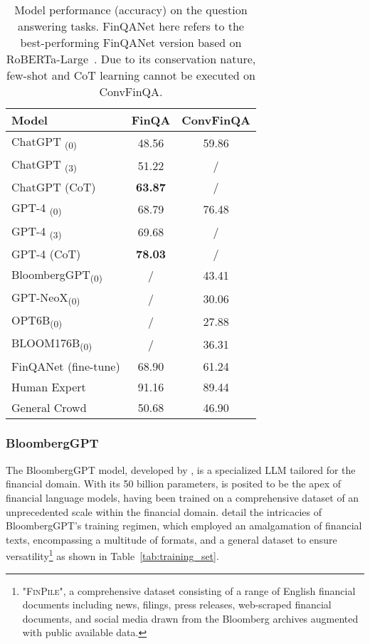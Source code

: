 \begin{table}[!h]
	\centering
	\begin{tabularx}{0.8\textwidth}{Xcc}
		\toprule
		\textbf{Model}                  & \textbf{FinQA} & \textbf{ConvFinQA} \\
		\midrule
		ChatGPT \textsubscript{(0)}     & 48.56          & 59.86              \\
		ChatGPT \textsubscript{(3)}     & 51.22          & /                  \\
		ChatGPT (CoT)                   & \textbf{63.87} & /                  \\
		GPT-4 \textsubscript{(0)}       & 68.79          & 76.48              \\
		GPT-4 \textsubscript{(3)}       & 69.68          & /                  \\
		GPT-4 (CoT)                     & \textbf{78.03} & /                  \\
		BloombergGPT\textsubscript{(0)} & /              & 43.41              \\
		GPT-NeoX\textsubscript{(0)}     & /              & 30.06              \\
		OPT6B\textsubscript{(0)}        & /              & 27.88              \\
		BLOOM176B\textsubscript{(0)}    & /              & 36.31              \\
		FinQANet (fine-tune)            & 68.90          & 61.24              \\
		Human Expert                    & 91.16          & 89.44              \\
		General Crowd                   & 50.68          & 46.90              \\
		\bottomrule
	\end{tabularx}
	\caption{Model performance (accuracy) on the question answering tasks. FinQANet here refers to the best-performing FinQANet version based on RoBERTa-Large~\cite{chen2022afinqa}. Due to its conservation nature, few-shot and CoT learning cannot be executed on ConvFinQA.}
	\label{tab:model_performance_qa}
\end{table}

\subsubsection{BloombergGPT}
\label{subsubsec:bloomberggpt}

The BloombergGPT model, developed by \textcite{wu2023bloomberggpt}, is a specialized LLM tailored for the financial domain.
With its 50 billion parameters, is posited to be the apex of financial language models, having been trained on a comprehensive dataset of an unprecedented scale within the financial domain.
\textcite{wu2023bloomberggpt} detail the intricacies of BloombergGPT's training regimen, which employed an amalgamation of financial texts, encompassing a multitude of formats, and a general dataset to ensure versatility\footnote{"\textsc{FinPile}", a comprehensive dataset consisting of a range of English financial documents including news, filings, press releases, web-scraped financial documents, and social media drawn from the Bloomberg archives augmented with public available data.} as shown in Table~\ref{tab:training_set}.

